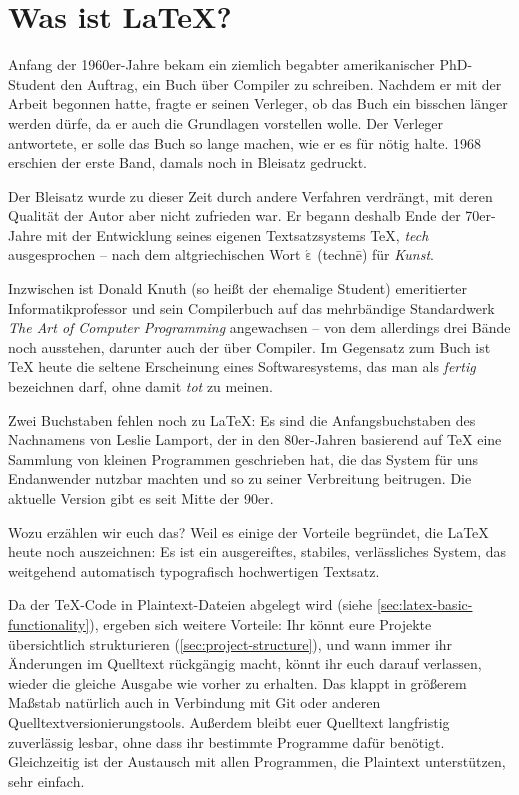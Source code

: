 \section{Was ist \LaTeX?}

Anfang der 1960er-Jahre bekam ein ziemlich begabter amerikanischer PhD-Student den Auftrag, ein Buch über Compiler zu schreiben.
Nachdem er mit der Arbeit begonnen hatte, fragte er seinen Verleger, ob das Buch ein bisschen länger werden dürfe, da er auch die Grundlagen vorstellen wolle.
Der Verleger antwortete, er solle das Buch so lange machen, wie er es für nötig halte.
1968 erschien der erste Band, damals noch in Bleisatz gedruckt.

Der Bleisatz wurde zu dieser Zeit durch andere Verfahren verdrängt, mit deren Qualität der Autor aber nicht zufrieden war. 
Er begann deshalb Ende der 70er-Jahre mit der Entwicklung seines eigenen Textsatzsystems \TeX, \emph{tech} ausgesprochen – nach dem altgriechischen Wort \texttau$\mathrm{\acute{\varepsilon}}$\textchi\textnu\texteta{} (technē) für \emph{Kunst}.

Inzwischen ist Donald Knuth (so heißt der ehemalige Student) emeritierter Informatikprofessor und sein Compilerbuch auf das mehrbändige Standardwerk \emph{The Art of Computer Programming} angewachsen – von dem allerdings drei Bände noch ausstehen, darunter auch der über Compiler.
Im Gegensatz zum Buch ist \TeX{} heute die seltene Erscheinung eines Softwaresystems, das man als \emph{fertig} bezeichnen darf, ohne damit \emph{tot} zu meinen.

Zwei Buchstaben fehlen noch zu \LaTeX: 
Es sind die Anfangsbuchstaben des Nachnamens von Leslie Lamport, der in den 80er-Jahren basierend auf \TeX{} eine Sammlung von kleinen Programmen geschrieben hat, die das System für uns Endanwender nutzbar machten und so zu seiner Verbreitung beitrugen.
Die aktuelle Version \LaTeXe{} gibt es seit Mitte der 90er.

Wozu erzählen wir euch das? 
Weil es einige der Vorteile begründet, die \LaTeX{} heute noch auszeichnen:
Es ist ein ausgereiftes, stabiles, verlässliches System,
das weitgehend automatisch typografisch hochwertigen Textsatz.

Da der \TeX-Code in Plaintext-Dateien abgelegt wird (siehe \cref{sec:latex-basic-functionality}), ergeben sich weitere Vorteile:
Ihr könnt eure Projekte übersichtlich strukturieren (\cref{sec:project-structure}),
und wann immer ihr Änderungen im Quelltext rückgängig macht, könnt ihr euch darauf verlassen, wieder die gleiche Ausgabe wie vorher zu erhalten. 
Das klappt in größerem Maßstab natürlich auch in Verbindung mit Git oder anderen Quelltextversionierungstools.
Außerdem bleibt euer Quelltext langfristig zuverlässig lesbar, ohne dass ihr bestimmte Programme dafür benötigt.
Gleichzeitig ist der Austausch mit allen Programmen, die Plaintext unterstützen, sehr einfach.

